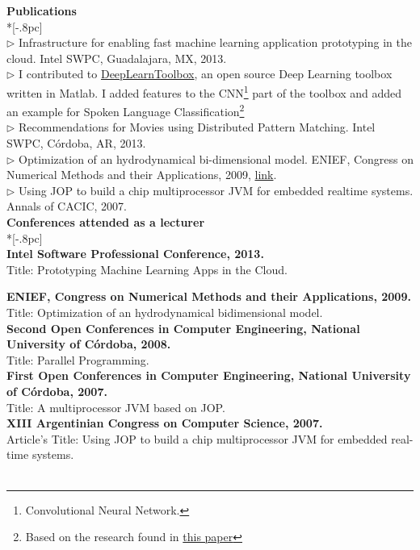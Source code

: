 \documentclass[letter,11pt,english]{article}
\begin{document}
\newpage
{\bf Publications} \\*[-.8pc]
\underline{\hspace{6in}} \\
$\triangleright$ Infrastructure for enabling fast machine learning application prototyping in the cloud. Intel SWPC, Guadalajara, MX, 2013.\\
$\triangleright$ I contributed to \href{https://github.com/rasmusbergpalm/DeepLearnToolbox} {DeepLearnToolbox},
an open source Deep Learning toolbox written in Matlab. I added features to the CNN\footnote{Convolutional Neural Network.}
part of the toolbox and added an example for Spoken Language Classification\footnote{Based on the research found in
\href{http://research.microsoft.com/en-us/um/people/dongyu/nips2009/papers/montavon-paper.pdf} {this paper}} \\
$\triangleright$ Recommendations for Movies using Distributed Pattern Matching. Intel SWPC, C\'ordoba, AR, 2013.\\
$\triangleright$ Optimization of an hydrodynamical bi-dimensional model. ENIEF, Congress on Numerical Methods 
and their Applications, 2009, \href{http://www.cimec.org.ar/ojs/index.php/mc/article/viewFile/2930/2867}{link}. \\
$\triangleright$ Using JOP to build a chip multiprocessor JVM for embedded realtime systems. Annals of CACIC, 2007.\\

{\large \bf Conferences attended as a lecturer} \\*[-.8pc]
\underline{\hspace{6in}} \\
{\bf  Intel Software Professional Conference, 2013.}\\
Title: Prototyping Machine Learning Apps in the Cloud. 

{\bf  ENIEF, Congress on Numerical Methods and their Applications, 2009.}\\
Title: Optimization of an hydrodynamical bidimensional model. 
\\
{\bf  Second Open Conferences in Computer Engineering, National University of C\'ordoba, 2008.}\\
Title: Parallel Programming.
\\
{\bf  First Open Conferences in Computer Engineering, National University of C\'ordoba, 2007.}\\
Title: A multiprocessor JVM based on JOP.
\\
{{\bf  XIII Argentinian Congress on Computer Science, 2007.}\\
Article's Title: Using JOP to build a chip multiprocessor JVM for embedded real-time systems.}\\
\\
\end{document}
